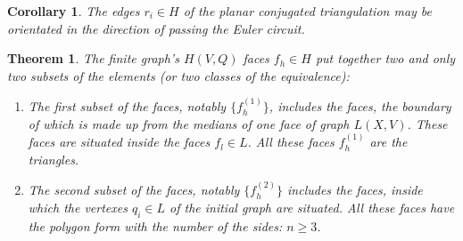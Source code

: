 \documentclass{amsart}
\newtheorem{theorem}{Theorem}
\theoremstyle{plain}
\newtheorem{corollary}{Corollary}
\numberwithin{equation}{section}
\begin{document}
\begin{corollary}
The edges $r_i \in H$ of the planar conjugated triangulation may be orientated in the direction of passing the Euler circuit.
\end {corollary}

\begin{theorem}
The finite graph's $H(V,Q)$ faces $f_h \in H$ put together two and only two subsets of the elements (or two classes of the equivalence):

\begin{enumerate}
\item	
The first subset of the faces, notably $\{f_h^{(1)}\}$, includes the faces, the boundary of which is made up from the medians of one face of graph $L(X,V)$. These faces are situated inside the faces $f_l \in L$. All these faces $f_h^{(1)}$ are the triangles.
\item	
The second subset of the faces, notably $\{f_h^{(2)}\}$ includes the faces, inside which the vertexes $q_i \in L$ of the initial graph are situated. All these faces have the polygon form with the number of the sides: $n \ge 3$.
\end{enumerate}
\end {theorem}
\end{document}
